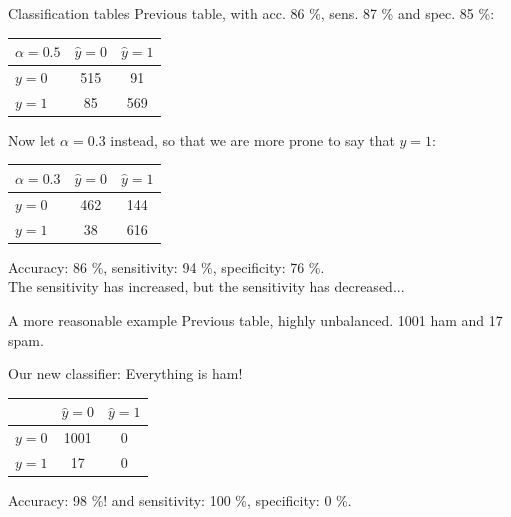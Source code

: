 \documentclass[10pt,handout]{beamer}
\begin{document}
\begin{frame}{Classification tables}
Previous table, with acc. 86 \%, sens. 87 \% and spec. 85 \%:
\begin{center}
\begin{tabular}{ l | c | c }
 {\color{uured}$\alpha=0.5$} & $\hat{y}=0$ & $\hat{y}=1$\\
  \hline
  $y=0$ & 515 & 91 \\
  $y=1$ & 85 & 569 \\
  \hline
\end{tabular}
\end{center}
\pause
Now let $\alpha=0.3$ instead, so that we are more prone to say that $\hat{y}=1$:
\begin{center}
\begin{tabular}{ l | c | c }
  {\color{uured}$\alpha=0.3$} & $\hat{y}=0$ & $\hat{y}=1$\\
  \hline
  $y=0$ & 462 & 144 \\
  $y=1$ & 38 & 616 \\
  \hline
\end{tabular}
\end{center}
Accuracy: 86 \%, sensitivity: 94 \%, specificity: 76 \%.\\[3mm]
The sensitivity has increased, but the sensitivity has decreased...

\end{frame}



\begin{frame}{A more reasonable example}
Previous table, highly unbalanced. 1001 ham and 17 spam.

Our new classifier: Everything is ham!\pause

\begin{center}
\begin{tabular}{ l | c | c }
  & $\hat{y}=0$ & $\hat{y}=1$\\
  \hline
  $y=0$ & 1001 & 0 \\
  $y=1$ & 17 & 0 \\
  \hline
\end{tabular}
\end{center}
\pause

Accuracy: 98 \%! and sensitivity: 100 \%, specificity: 0 \%.\\[3mm]

\end{frame}
\end{document}
